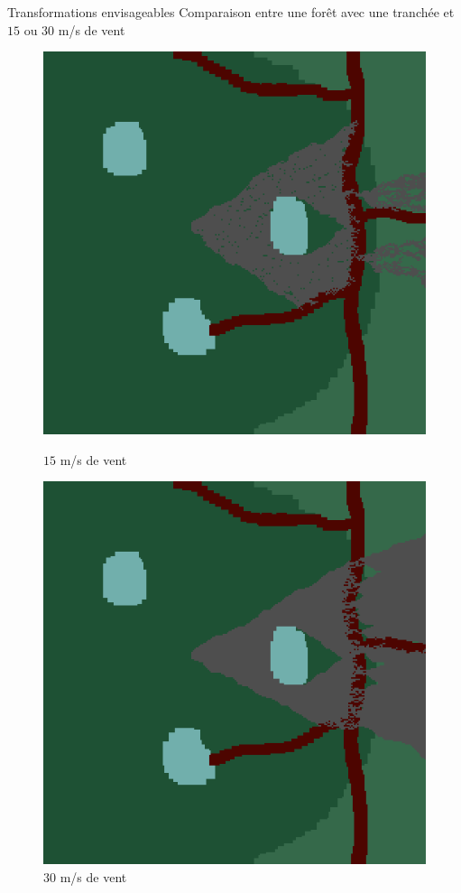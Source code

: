 \documentclass{beamer}
\begin{document}
\begin{frame}{Transformations envisageables \hyperlink{jump}{\beamerbutton{ }} \hypertarget{15}{\beamerbutton{ }}}
    Comparaison entre une forêt avec une tranchée et $15$ ou $30$ m/s de vent
    
    \begin{figure}[!htb]
        \begin{minipage}{0.48\textwidth}
          \centering
          \includegraphics[width=.8\linewidth]{pictures/trans/treach_15.png}
          \caption{$15$ m/s de vent}\label{Fig:Data1}
        \end{minipage}\hfill
        \begin{minipage}{0.48\textwidth}
          \centering
          \includegraphics[width=.8\linewidth]{pictures/trans/treach_30.png}
          \caption{$30$ m/s de vent}\label{Fig:Data2}
        \end{minipage}
     \end{figure}
\end{frame}
\end{document}

